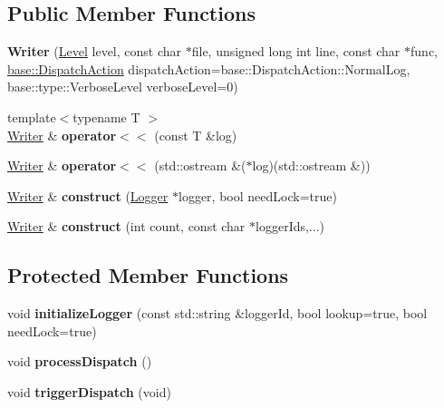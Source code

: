 \subsection*{Public Member Functions}
\begin{DoxyCompactItemize}
\item 
\mbox{\label{classel_1_1base_1_1_writer_ac2a835925f37fd2ca3da00998d8a533c}} 
{\bfseries Writer} (\hyperlink{namespaceel_ab0ac6091262344c52dd2d3ad099e8e36}{Level} level, const char $\ast$file, unsigned long int line, const char $\ast$func, \hyperlink{namespaceel_1_1base_a3aa2563d38e47388ba242a1694fc2839}{base\+::\+Dispatch\+Action} dispatch\+Action=base\+::\+Dispatch\+Action\+::\+Normal\+Log, base\+::type\+::\+Verbose\+Level verbose\+Level=0)
\item 
\mbox{\label{classel_1_1base_1_1_writer_ab94f0d920c6465a57937e893aa9f5ada}} 
{\footnotesize template$<$typename T $>$ }\\\hyperlink{classel_1_1base_1_1_writer}{Writer} \& {\bfseries operator$<$$<$} (const T \&log)
\item 
\mbox{\label{classel_1_1base_1_1_writer_aea6d7f996ff92e9485a76ad3955f0a29}} 
\hyperlink{classel_1_1base_1_1_writer}{Writer} \& {\bfseries operator$<$$<$} (std\+::ostream \&($\ast$log)(std\+::ostream \&))
\item 
\mbox{\label{classel_1_1base_1_1_writer_a282d82f392a3e6fef9eda47ce53e87dc}} 
\hyperlink{classel_1_1base_1_1_writer}{Writer} \& {\bfseries construct} (\hyperlink{classel_1_1_logger}{Logger} $\ast$logger, bool need\+Lock=true)
\item 
\mbox{\label{classel_1_1base_1_1_writer_ab2bc960787eb3c9b01569629dcbeb246}} 
\hyperlink{classel_1_1base_1_1_writer}{Writer} \& {\bfseries construct} (int count, const char $\ast$logger\+Ids,...)
\end{DoxyCompactItemize}
\subsection*{Protected Member Functions}
\begin{DoxyCompactItemize}
\item 
\mbox{\label{classel_1_1base_1_1_writer_ae687ebbee62b086f318ee4c8d1a655c4}} 
void {\bfseries initialize\+Logger} (const std\+::string \&logger\+Id, bool lookup=true, bool need\+Lock=true)
\item 
\mbox{\label{classel_1_1base_1_1_writer_a692d05d209840d6ae8c2c8e0bea21d29}} 
void {\bfseries process\+Dispatch} ()
\item 
\mbox{\label{classel_1_1base_1_1_writer_a1c7d90bd4e00af4e7307f5936e1b6507}} 
void {\bfseries trigger\+Dispatch} (void)
\end{DoxyCompactItemize}
